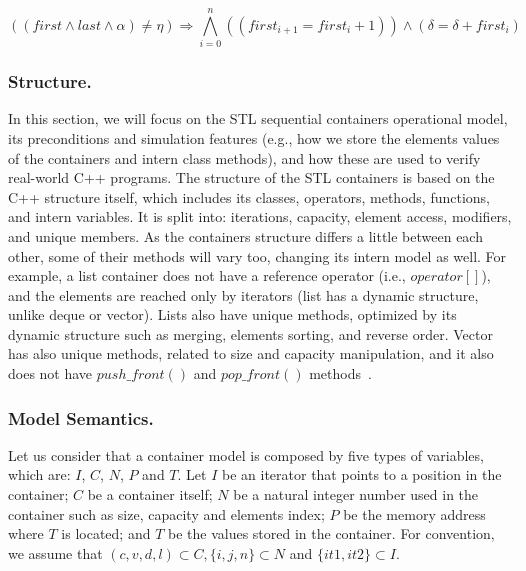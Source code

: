 \documentclass[a4paper]{llncs}
\begin{document}
\begin{equation}
\left(\left(first \wedge last \wedge \alpha\right) \neq \eta\right) \Rightarrow
\bigwedge^{n}_{i=0} \left(\left(first_{i+1} = first_{i} +1\right)\right) \wedge \left(\delta = \delta + first_{i}\right)
\label{eq:accumulate}
\end{equation}

\subsubsection{Structure.}

In this section, we will focus on the STL sequential
containers operational model, its preconditions and
simulation features (e.g., how we store the elements
values of the containers and intern class methods),
and how these are used to verify real-world C++ programs.
The structure of the STL containers is based on the
C++ structure itself, which includes its classes, operators,
methods, functions, and intern variables. It is split into:
iterations, capacity, element access, modifiers, and unique
members. As the containers structure differs a little
between each other, some of their methods will vary too,
changing its intern model as well. For example, a list container
does not have a reference operator (i.e., $operator\left[\right]$), and the elements
are reached only by iterators (list has a dynamic structure,
unlike deque or vector). Lists also have unique methods, optimized by its
dynamic structure such as merging, elements sorting, and reverse order.
Vector has also unique methods, related to size and capacity manipulation,
and it also does not have $push\_front\left(\right)$
and $pop\_front\left(\right)$ methods~\cite{CppReference12}.

\subsubsection{Model Semantics.}

Let us consider that a container model is composed
by five types of variables, which are: $I$, $C$,
$N$, $P$ and $T$. Let $I$ be an iterator that points
to a position in the container; $C$ be a container itself;
$N$ be a natural integer number used in the container
such as size, capacity and elements index; $P$ be
the memory address where $T$ is located; and $T$ be the
values stored in the container.
For convention, we assume that
$\left(c, v, d, l\right) \subset C, \{i, j, n\}
\subset N$ and $\{it1, it2\} \subset I$.
\end{document}
